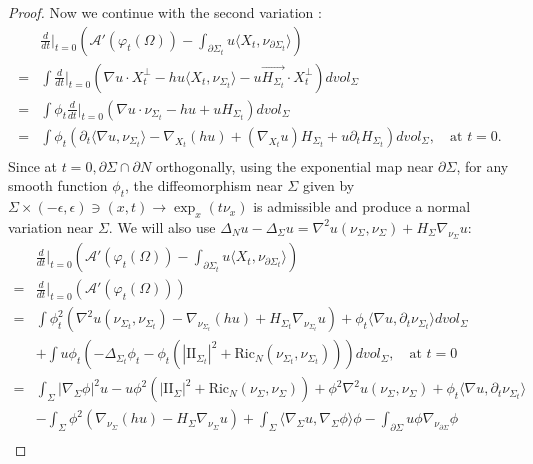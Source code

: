 \documentclass[12pt]{amsart}
\newcommand{\sff}{\mathrm{I\!I}}
\newcommand{\Ric}{\text{Ric}}
\newcommand{\p}{\partial}
\numberwithin{equation}{section}
\begin{document}
\begin{proof}
		Now we continue with the second variation :
		\begin{align*}
			&\frac{d}{dt}\Big\vert_{t=0}(\mathcal{A}'(\varphi_t(\Omega))-\int_{\partial \Sigma_t} u \langle X_t, \nu_{\partial \Sigma_t}\rangle)\\
			=& \int \frac{d}{dt}\Big\vert_{t=0}(\nabla u \cdot X^{\perp}_t -hu\langle X_t, \nu_{\Sigma_t}\rangle-u\vec{H_{\Sigma_t}}\cdot X^{\perp}_t ) dvol_{\Sigma}\\
			=&\int \phi_t \frac{d}{dt} \Big\vert_{t=0}(\nabla u \cdot \nu_{\Sigma_t} -hu+uH_{\Sigma_t})dvol_{\Sigma}\\
			=& \int \phi_t (\partial_t \langle\nabla u,  \nu_{\Sigma_t}\rangle-\nabla_{X_t}(hu)+ (\nabla_{X_t} u) H_{\Sigma_t}+ u \partial_t H_{\Sigma_t}) dvol_{\Sigma},  \quad \text{at $t=0$}.\\
		\end{align*}
			Since at $t=0, \partial \Sigma \cap \partial N$ orthogonally, using the exponential map near $\partial \Sigma$, for any smooth function $\phi_t$, the diffeomorphism near $\Sigma$ given by $\Sigma \times (-\epsilon,\epsilon) \ni (x,t) \rightarrow \exp_x(t\nu_x)$ is admissible and produce a normal variation near $\Sigma$.
			We will also use $\Delta_N u-\Delta_{\Sigma}u=\nabla^2 u(\nu_{\Sigma},\nu_{\Sigma})+H_{\Sigma}\nabla_{\nu_{\Sigma}}u$:
		\begin{align*}
			&\frac{d}{dt}\Big\vert_{t=0}(\mathcal{A}'(\varphi_t(\Omega))-\int_{\partial \Sigma_t} u \langle X_t, \nu_{\partial \Sigma_t}\rangle)\\
			=&\frac{d}{dt}\Big\vert_{t=0}(\mathcal{A}'(\varphi_t(\Omega)))\\
			=& \int \phi_t^2(\nabla^2u(\nu_{\Sigma_t},\nu_{\Sigma_t})-\nabla_{ \nu_{\Sigma_t}}(hu)+H_{\Sigma_t}\nabla_{ \nu_{\Sigma_t}}u) +\phi_t \langle\nabla u,\p_t \nu_{\Sigma_t}\rangle dvol_{\Sigma}\\
			&+ \int u \phi_t(-\Delta_{\Sigma_t} \phi_t-\phi_t(|\sff_{\Sigma_t}|^2+\Ric_N(\nu_{\Sigma_t},\nu_{\Sigma_t})))dvol_{\Sigma}  ,  \quad \text{at $t=0$} \\
			=& \int_{\Sigma} |\nabla_{\Sigma} \phi|^2u  -u\phi^2(|\sff_{\Sigma}|^2+\Ric_N(\nu_{\Sigma},\nu_{\Sigma}))+ \phi^2 \nabla^2 u(\nu_{\Sigma},\nu_{\Sigma})+\phi_t \langle\nabla u,\p_t \nu_{\Sigma_t}\rangle\\
			&-\int_{\Sigma} \phi^2(\nabla_{ \nu_{\Sigma}}(hu)-H_{\Sigma}\nabla_{ \nu_{\Sigma}}u)+\int_{\Sigma} \langle \nabla_{\Sigma} u, \nabla_{\Sigma} \phi \rangle \phi   -\int_{\partial \Sigma} u\phi \nabla_{\nu_{\partial \Sigma}} \phi\\

\end{align*}
\end{proof}
\end{document}
